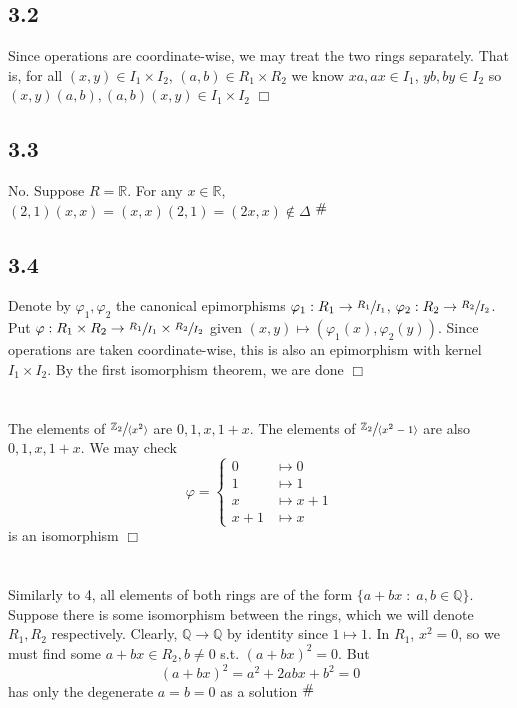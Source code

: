 \documentclass{article}
\newcommand{\contra}{\raisebox{\depth}{\#}}
\begin{document}
\section{}
\subsection*{3.2}
Since operations are coordinate-wise, we may treat the two rings separately. That is, for all $(x,y) \in I_1 \times I_2$, $(a,b) \in R_1 \times R_2$ we know $xa, ax \in I_1$, $yb, by \in I_2$ so $(x,y)(a,b), (a,b)(x,y) \in I_1 \times I_2$ $\Box$
\subsection*{3.3}
No. Suppose $R = \mathbb{R}$. For any $x \in \mathbb{R}$, $(2,1)(x,x) = (x,x)(2,1) = (2x,x) \notin \Delta$ $\contra$
\subsection*{3.4}
Denote by $\varphi_1,\varphi_2$ the canonical epimorphisms $\varphi_1: R_1 \to \sfrac{R_1}{I_1}$, $\varphi_2: R_2 \to \sfrac{R_2}{I_2}$. Put $\varphi : R_1 \times R_2 \to \sfrac{R_1}{I_1} \times \sfrac{R_2}{I_2}$ given $(x,y) \mapsto (\varphi_1(x),\varphi_2(y))$. Since operations are taken coordinate-wise, this is also an epimorphism with kernel $I_1 \times I_2$. By the first isomorphism theorem, we are done $\Box$


\section{}
The elements of $\sfrac{\mathbb{Z}_2}{\langle x^2 \rangle}$ are $0,1,x,1+x$. The elements of $\sfrac{\mathbb{Z}_2}{\langle x^2-1 \rangle}$ are also $0,1,x,1+x$. We may check
$$\varphi = \begin{cases}
0 &\mapsto 0\\
1 &\mapsto 1\\
x &\mapsto x+1\\
x+1 &\mapsto x
\end{cases}$$
is an isomorphism $\Box$

\section{}
Similarly to 4, all elements of both rings are of the form $\{a + bx \;:\; a,b \in \mathbb{Q}\}$. Suppose there is some isomorphism between the rings, which we will denote $R_1,R_2$ respectively. Clearly, $\mathbb{Q} \rightarrow \mathbb{Q}$ by identity since $1 \mapsto 1$. In $R_1$, $x^2 = 0$, so we must find some $a+bx \in R_2, b \neq 0$ s.t. $(a+bx)^2 = 0$. But
$$(a+bx)^2 = a^2 + 2abx + b^2 = 0$$
has only the degenerate $a = b = 0$ as a solution $\contra$
\end{document}
